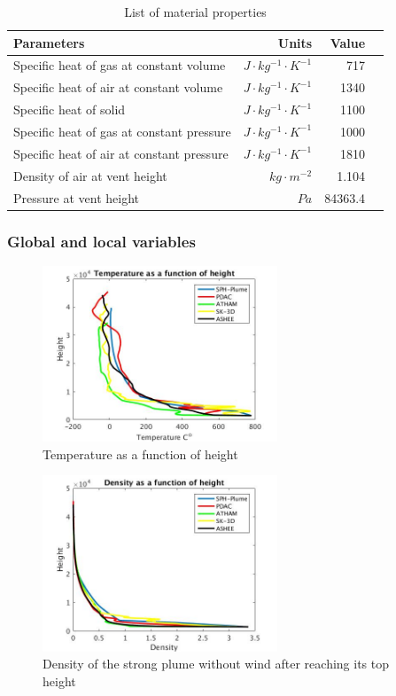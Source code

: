 \documentclass[journal abbreviation, manuscript]{copernicus}
\begin{document}
\begin{table}[htp]
	\begin{centering}
      \caption{List of material properties}		
	  \begin{tabular}{lrrr}
	    \hline
	    Parameters & Units  & Value \\
	    \hline
	    	Specific heat of gas at constant volume     & $J \cdot kg^{-1}\cdot K^{-1}$& 717     \\
	    Specific heat of air at constant volume     & $J \cdot kg^{-1}\cdot K^{-1}$& 1340    \\
	    	Specific heat of solid                      & $J \cdot kg^{-1}\cdot K^{-1}$& 1100    \\
	    	Specific heat of gas at constant pressure   & $J \cdot kg^{-1}\cdot K^{-1}$& 1000    \\
	    	Specific heat of air at constant pressure   & $J \cdot kg^{-1}\cdot K^{-1}$& 1810    \\
	    	Density of air at vent height               & $kg \cdot m^{-2}$       & 1.104   \\
	    Pressure at vent height                        & $Pa$              & 84363.4 \\
	    \hline
	  \end{tabular}
	  \label{tab:material_properties}
	\end{centering}
\end{table}

\subsubsection{Global and local variables}

\begin{figure}
\center
\includegraphics[width=7cm]{Temp}
\caption{Temperature as a function of height}
\label{fig:strong_local_temp}
\end{figure}
\begin{figure}
\center
\includegraphics[width=7cm]{density_strong}
\caption{Density of the strong plume without wind after reaching its top height}
\label{fig:strong_local_density}
\end{figure}
\end{document}
